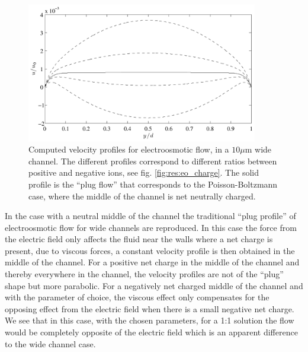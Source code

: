 \begin{figure}
\begin{center}
\includegraphics[width=0.9\textwidth]{fig/eo_u.pdf}
\end{center}
\caption{Computed velocity profiles for electroosmotic flow, in a $10
  \mu$m wide channel. The different profiles correspond to different
  ratios between positive and negative ions, see
  fig. \ref{fig:res:eo_charge}. The solid profile is the ``plug flow''
that corresponds to the Poisson-Boltzmann case, where the middle of
the channel is net neutrally charged.}
\label{fig:res:eo_u}
\end{figure}

In the case with a neutral middle of the channel the traditional
``plug profile'' of electroosmotic flow for wide channels are
reproduced. In this case the force from the electric field only
affects the fluid near the walls where a net charge is present, due to
viscous forces, a constant velocity profile is then obtained in the
middle of the channel. For a positive net charge in the middle of the
channel and thereby everywhere in the channel, the velocity profiles
are not of the ``plug'' shape but more parabolic. For a negatively net
charged middle of the channel and with the parameter of choice, the
viscous effect only compensates for the opposing effect from the
electric field when there is a small negative net charge. We see that
in this case, with the chosen parameters, for a 1:1 solution the flow
would be completely opposite of the electric field which is an
apparent difference to the wide channel case.
